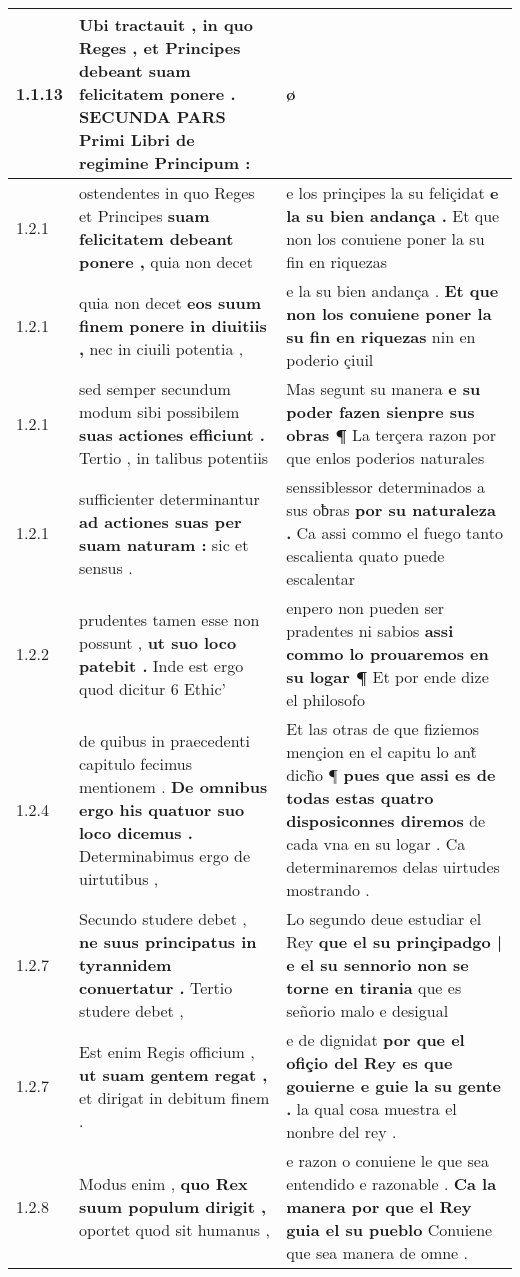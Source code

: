 \begin{tabular}{|p{1cm}|p{6.5cm}|p{6.5cm}|}
1.1.13 & Ubi tractauit , \textbf{ in quo Reges , et Principes debeant suam felicitatem ponere . } SECUNDA PARS Primi Libri de regimine Principum : & ø \\\hline
1.2.1 & ostendentes in quo Reges et Principes \textbf{ suam felicitatem debeant ponere , } quia non decet & e los prinçipes la su feliçidat \textbf{ e la su bien andança . } Et que non los conuiene poner la su fin en riquezas \\\hline
1.2.1 & quia non decet \textbf{ eos suum finem ponere in diuitiis , } nec in ciuili potentia , & e la su bien andança . \textbf{ Et que non los conuiene poner la su fin en riquezas } nin en poderio çiuil \\\hline
1.2.1 & sed semper secundum modum sibi possibilem \textbf{ suas actiones efficiunt . } Tertio , in talibus potentiis & Mas segunt su manera \textbf{ e su poder fazen sienpre sus obras ¶ } La terçera razon por que enlos poderios naturales \\\hline
1.2.1 & sufficienter determinantur \textbf{ ad actiones suas per suam naturam : } sic et sensus . & senssiblessor determinados a sus oƀras \textbf{ por su naturaleza . } Ca assi commo el fuego tanto escalienta quato puede escalentar \\\hline
1.2.2 & prudentes tamen esse non possunt , \textbf{ ut suo loco patebit . } Inde est ergo quod dicitur 6 Ethic’ & enpero non pueden ser pradentes ni sabios \textbf{ assi commo lo prouaremos en su logar ¶ } Et por ende dize el philosofo \\\hline
1.2.4 & de quibus in praecedenti capitulo fecimus mentionem . \textbf{ De omnibus ergo his quatuor suo loco dicemus . } Determinabimus ergo de uirtutibus , & Et las otras de que fiziemos mençion en el capitu lo ant̃ dich̃o ¶ \textbf{ pues que assi es de todas estas quatro disposiconnes diremos } de cada vna en su logar . Ca determinaremos delas uirtudes mostrando . \\\hline
1.2.7 & Secundo studere debet , \textbf{ ne suus principatus in tyrannidem conuertatur . } Tertio studere debet , & Lo segundo deue estudiar el Rey \textbf{ que el su prinçipadgo | e el su sennorio non se torne en tirania } que es señorio malo e desigual \\\hline
1.2.7 & Est enim Regis officium , \textbf{ ut suam gentem regat , } et dirigat in debitum finem . & e de dignidat \textbf{ por que el ofiçio del Rey es que gouierne e guie la su gente . } la qual cosa muestra el nonbre del rey . \\\hline
1.2.8 & Modus enim , \textbf{ quo Rex suum populum dirigit , } oportet quod sit humanus , & e razon o conuiene le que sea entendido e razonable . \textbf{ Ca la manera por que el Rey guia el su pueblo } Conuiene que sea manera de omne . \\\hline

\end{tabular}
